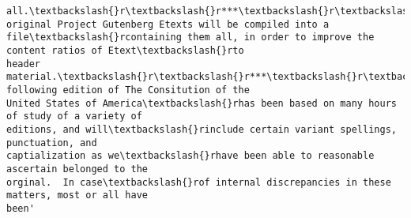 \documentclass[11pt]{article}
\begin{document}
\begin{tcolorbox}[breakable, size=fbox, boxrule=.5pt, pad at break*=1mm, opacityfill=0]
\begin{Verbatim}[commandchars=\\\{\}]
all.\textbackslash{}r\textbackslash{}r***\textbackslash{}r\textbackslash{}rThese original Project Gutenberg Etexts will be compiled into a
file\textbackslash{}rcontaining them all, in order to improve the content ratios of Etext\textbackslash{}rto
header material.\textbackslash{}r\textbackslash{}r***\textbackslash{}r\textbackslash{}r\textbackslash{}r\textbackslash{}rThe following edition of The Consitution of the
United States of America\textbackslash{}rhas been based on many hours of study of a variety of
editions, and will\textbackslash{}rinclude certain variant spellings, punctuation, and
captialization as we\textbackslash{}rhave been able to reasonable ascertain belonged to the
orginal.  In case\textbackslash{}rof internal discrepancies in these matters, most or all have
been'
\end{Verbatim}
\end{tcolorbox}
        
\end{document}
